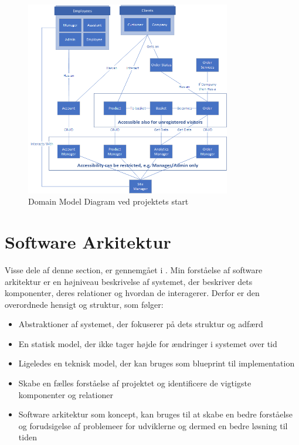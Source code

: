 \begin{figure}
    \centering
    \includegraphics[width=0.8\textwidth]{figures/diagrams/dmd-start.png}
    \caption{Domain Model Diagram ved projektets start}
    \label{fig:domain-model-diagram}
\end{figure}

\section{Software Arkitektur}
Visse dele af denne section, er gennemgået i . 
Min forståelse af software arkitektur er en højniveau beskrivelse af systemet, der beskriver dets komponenter, deres relationer og hvordan de interagerer. Derfor er den overordnede hensigt og struktur, som følger:
\begin{itemize}
    \item Abstraktioner af systemet, der fokuserer på dets struktur og adfærd
    \item En statisk model, der ikke tager højde for ændringer i systemet over tid
    \item Ligeledes en teknisk model, der kan bruges som blueprint til implementation
    \item Skabe en fælles forståelse af projektet og identificere de vigtigste komponenter og relationer
    \item Software arkitektur som koncept, kan bruges til at skabe en bedre forståelse og forudsigelse af problemeer for udviklerne og dermed en bedre løsning til tiden
\end{itemize}

